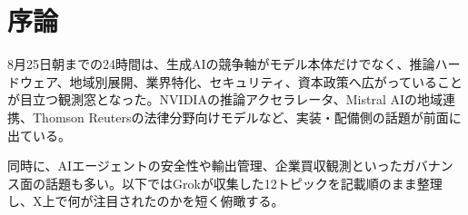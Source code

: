 \section*{序論}
8月25日朝までの24時間は、生成AIの競争軸がモデル本体だけでなく、推論ハードウェア、地域別展開、業界特化、セキュリティ、資本政策へ広がっていることが目立つ観測窓となった。NVIDIAの推論アクセラレータ、Mistral AIの地域連携、Thomson Reutersの法律分野向けモデルなど、実装・配備側の話題が前面に出ている。

同時に、AIエージェントの安全性や輸出管理、企業買収観測といったガバナンス面の話題も多い。以下ではGrokが収集した12トピックを記載順のまま整理し、X上で何が注目されたのかを短く俯瞰する。
